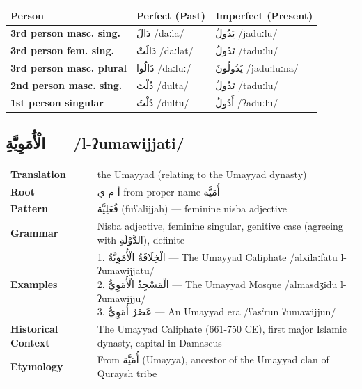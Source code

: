 \documentclass[letterpaper,12pt]{article}
\begin{document}
\begin{longtable}{|>{\raggedright}p{3.5cm}|p{5cm}|p{5cm}|}
\hline
\textbf{Person} & \textbf{Perfect (Past)} & \textbf{Imperfect (Present)} \\
\hline
\textbf{3rd person masc. sing.} & \textarabic{دَالَ} /daːla/ & \textarabic{يَدُولُ} /jaduːlu/ \\
\hline
\textbf{3rd person fem. sing.} & \textarabic{دَالَتْ} /daːlat/ & \textarabic{تَدُولُ} /taduːlu/ \\
\hline
\textbf{3rd person masc. plural} & \textarabic{دَالُوا} /daːluː/ & \textarabic{يَدُولُونَ} /jaduːluːna/ \\
\hline
\textbf{2nd person masc. sing.} & \textarabic{دُلْتَ} /dulta/ & \textarabic{تَدُولُ} /taduːlu/ \\
\hline
\textbf{1st person singular} & \textarabic{دُلْتُ} /dultu/ & \textarabic{أَدُولُ} /ʔaduːlu/ \\
\hline
\end{longtable}

\subsection{\textarabic{الْأُمَوِيَّةِ} — /l-ʔumawijjati/}
\begin{tabular}{p{3cm}p{10cm}}
\toprule
\textbf{Translation} & the Umayyad (relating to the Umayyad dynasty) \\
\textbf{Root} & \textarabic{أ-م-ي} from proper name \textarabic{أُمَيَّة} \\
\textbf{Pattern} & \textarabic{فُعَلِيَّة} (fuʕalijjah) — feminine nisba adjective \\
\textbf{Grammar} & Nisba adjective, feminine singular, genitive case (agreeing with \textarabic{الدَّوْلَةِ}), definite \\
\midrule
\textbf{Examples} & \makecell[l]{\parbox{9.5cm}{
1. \textarabic{الْخِلَافَةُ الْأُمَوِيَّةُ} — The Umayyad Caliphate /alxilaːfatu l-ʔumawijjatu/\\
2. \textarabic{الْمَسْجِدُ الْأُمَوِيُّ} — The Umayyad Mosque /almasdʒidu l-ʔumawijju/\\
3. \textarabic{عَصْرٌ أُمَوِيٌّ} — An Umayyad era /ʕasˤrun ʔumawijjun/
}} \\
\midrule
\textbf{Historical Context} & The Umayyad Caliphate (661-750 CE), first major Islamic dynasty, capital in Damascus \\
\textbf{Etymology} & From \textarabic{أُمَيَّة} (Umayya), ancestor of the Umayyad clan of Quraysh tribe \\
\bottomrule
\end{tabular}
\end{document}
